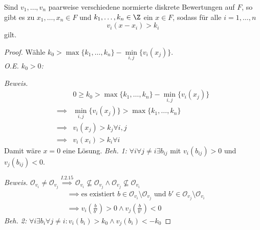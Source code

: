 \begin{theorem}
    Sind $v_1,\ldots,v_n$ paarweise verschiedene normierte diskrete Bewertungen auf $F$, so gibt es zu 
    $x_1,\ldots,x_n \in F$ und $k_1, \ldots,k_n \in \Z$ ein $x \in F$, sodass für alle $i = 1, \ldots,n$
    $$ v_i(x - x_i) > k_i$$
    gilt.  
\end{theorem}
\begin{proof}
    Wähle $k_0 > \max\{k_1, \ldots, k_n\} - \min\limits_{i,j}\{v_i(x_j)\}$.\\
    \emph{O.E. $k_0 > 0$:}

    \emph{Beweis.}
    \begin{align*}
        & 0 \geq k_0 > \max\{k_1, \ldots, k_n\} - \min_{i,j} \{v_i(x_j)\}\\
        \implies & \min_{i,j} \{v_i(x_j)\} > \max\{k_1, \ldots, k_n\}\\
        \implies & v_i(x_j) > k_j \forall i,j\\
        \implies & v_i(x_i) > k_i \forall i
    \end{align*}
    Damit wäre $x=0$ eine Lösung.\nl
    \emph{Beh. 1:} $\forall i \forall j\ne i \exists b_{ij}$ mit $v_i(b_{ij}) > 0$ und $v_j(b_{ij}) < 0$.

    \emph{Beweis.} $\mathcal{O}_{v_i} \ne \mathcal{O}_{v_j} \stackrel{I.2.15}{\implies} \mathcal{O}_{v_i} \not \subseteq \mathcal{O}_{v_j}
    \land \mathcal{O}_{v_j} \not \subseteq \mathcal{O}_{v_i}$ 
    \begin{align*}
        & \implies \text{es existiert } b \in \mathcal{O}_{v_i} \setminus \mathcal{O}_{v_j} \text{ und } b' \in \mathcal{O}_{v_j} \setminus \mathcal{O}_{v_i}\\
        & \implies v_i(\frac{b}{b'}) > 0 \land v_j(\frac{b}{b'}) < 0
    \end{align*}
    \emph{Beh. 2:} $\forall i \exists b_i \forall j \ne i: v_i(b_i) > k_0 \land v_j(b_i) < -k_0$


\end{proof}
